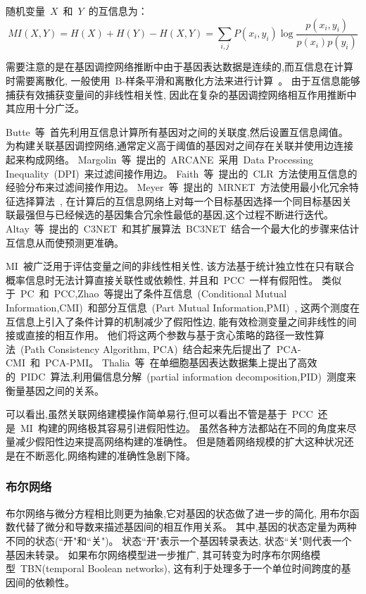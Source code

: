 \begin{enumerate}
随机变量~$X$~和~$Y$~的互信息为：
\begin{equation}
MI(X,Y) = H(X) + H(Y) - H(X,Y) = \sum\limits_{i,j} {P(x_i ,y_i )\log \frac{{p(x_i,y_i )}}{{p(x_i )p(y_i )}}} 
\end{equation}

需要注意的是在基因调控网络推断中由于基因表达数据是连续的,而互信息在计算时需要离散化,
一般使用~B-样条平滑和离散化方法来进行计算~\cite{daub2004estimating}。
由于互信息能够捕获有效捕获变量间的非线性相关性,
因此在复杂的基因调控网络相互作用推断中其应用十分广泛\cite{brunel2010miss,zhang2011inferring}。

Butte~等~\cite{basso2005reverse}首先利用互信息计算所有基因对之间的关联度,然后设置互信息阈值。
为构建关联基因调控网络,通常定义高于阈值的基因对之间存在关联并使用边连接起来构成网络。
Margolin~等~\cite{margolin2006aracne}提出的~ARCANE~采用~Data Processing Inequality~(DPI)~来过滤间接作用边。
Faith~等~\cite{faith2007large}提出的~CLR~方法使用互信息的经验分布来过滤间接作用边。
Meyer~等~\cite{meyer2007information}提出的~MRNET~方法使用最小化冗余特征选择算法~\cite{peng2005feature},
在计算后的互信息网络上对每一个目标基因选择一个同目标基因关联最强但与已经候选的基因集合冗余性最低的基因,这个过程不断进行迭代。
Altay~等~\cite{altay2010inferring}提出的~C3NET~和其扩展算法~BC3NET~\cite{de2012bagging}结合一个最大化的步骤来估计互信息从而使预测更准确。

MI~被广泛用于评估变量之间的非线性相关性,
该方法基于统计独立性在只有联合概率信息时无法计算直接关联性或依赖性,
并且和~PCC~一样有假阳性\cite{frenzel2007partial,schreiber2000measuring}。
类似于~PC~和~PCC,Zhao~等提出了条件互信息~(Conditional Mutual Information,CMI)~\cite{zhang2011inferring}和部分互信息~(Part Mutual Information,PMI)~\cite{zhao2016part},
这两个测度在互信息上引入了条件计算的机制减少了假阳性边,
能有效检测变量之间非线性的间接或直接的相互作用。
他们将这两个参数与基于贪心策略的路径一致性算法~(Path Consistency Algorithm, PCA)~结合起来先后提出了~PCA-CMI\cite{zhang2011inferring}~和~PCA-PMI\cite{zhao2016part}。
Thalia~等~\cite{chan2017gene}在单细胞基因表达数据集上提出了高效的~PIDC~算法,利用偏信息分解~(partial information decomposition,PID)~测度来衡量基因之间的关系。
\end{enumerate}

可以看出,虽然关联网络建模操作简单易行,但可以看出不管是基于~PCC~还是~MI~构建的网络极其容易引进假阳性边。
虽然各种方法都站在不同的角度来尽量减少假阳性边来提高网络构建的准确性。
但是随着网络规模的扩大这种状况还是在不断恶化,网络构建的准确性急剧下降。

\subsubsection{布尔网络}
布尔网络与微分方程相比则更为抽象,它对基因的状态做了进一步的简化,
用布尔函数代替了微分和导数来描述基因间的相互作用关系。
其中,基因的状态定量为两种不同的状态(``开"和``关")。
状态``开"表示一个基因转录表达, 状态``关"则代表一个基因未转录。
如果布尔网络模型进一步推广, 其可转变为时序布尔网络模型~TBN(temporal Boolean networks), 这有利于处理多于一个单位时间跨度的基因间的依赖性。

